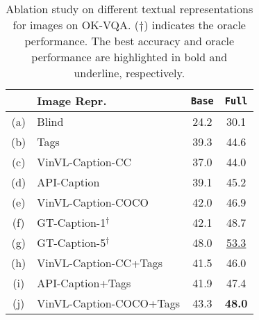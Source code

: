 \begin{table}[t]
\small
\centering
\vspace{-0.0in}
\begin{tabular}{ c l || c c}
    \hline
    & Image Repr. & \textbf{\texttt{Base}} & \textbf{\texttt{Full}} \\
    \hline
    (a) & Blind & 24.2 & 30.1 \\
    (b) & Tags & 39.3 & 44.6 \\
    (c) & VinVL-Caption-CC & 37.0 & 44.0 \\
    (d) & API-Caption & 39.1 & 45.2\\
    (e) & VinVL-Caption-COCO & 42.0 & 46.9 \\
    (f) & GT-Caption-1$^\dagger$ & 42.1 & 48.7\\
    (g) & GT-Caption-5$^\dagger$ & 48.0 & \underline{53.3} \\
    \hline
    (h) & VinVL-Caption-CC+Tags & 41.5 & 46.0 \\
    (i) & API-Caption+Tags & 41.9 & 47.4 \\
    (j) & VinVL-Caption-COCO+Tags & 43.3 & \textbf{48.0}\\
    \hline
\end{tabular}
\vspace{-2mm}
\caption{\small Ablation study on different textual representations for images on OK-VQA. ($\dagger$) indicates the oracle performance. The best accuracy and oracle performance are highlighted in bold and underline, respectively.}
\vspace{-2mm}
\label{table:content}
\end{table}


